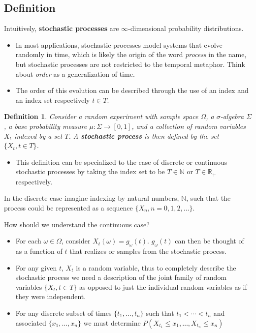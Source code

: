 \subsection{Definition}
\begin{frame}
Intuitively, \textbf{stochastic processes} are $\infty$-dimensional probability distributions.
\end{frame}

\begin{frame}
\begin{itemize}
\item In most applications, stochastic processes model systems that evolve randomly in time, which is likely the origin of the word \emph{process} in the name, but stochastic processes are not restricted to the temporal metaphor. Think about \emph{order} as a generalization of time.
\item The order of this evolution can be described through the use of an index and an index set respectively $t \in T$.
\end{itemize}

\newtheorem{stpo}{Definition}
\begin{stpo}
Consider a random experiment with sample space $\Omega$, a $\sigma$-algebra $\Sigma$, a base probability measure $\mu : \Sigma \rightarrow [0,1]$, and a collection of random variables $X_t$ indexed by a set $T$. A \textbf{stochastic process} is then defined by the set $\{X_t, t \in T\}$.
\end{stpo}
\begin{itemize}
\item This definition can be specialized to the case of discrete or continuous stochastic processes by taking the index set to be $T \in \mathbb{N}$ or $T \in \mathbb{R}_+$ respectively.
\end{itemize}
\end{frame}

\begin{frame}
In the discrete case imagine indexing by natural numbers, $\mathbb{N}$, such that the process could be represented as a sequence $\{ X_n, n = 0,1,2,\ldots \}$.
\end{frame}

\begin{frame}
How should we understand the continuous case?
\begin{itemize}
\item For each $\omega \in \Omega$, consider $X_t(\omega)=g_\omega(t)$. $g_\omega(t)$ can then be thought of as a function of $t$ that realizes or samples from the stochastic process.
\item For any given $t$, $X_t$ is a random variable, thus to completely describe the stochastic process we need a description of the joint family of random variables $\{ X_t, t \in T \}$ as opposed to just the individual random variables as if they were independent.
\item For any discrete subset of times $\{ t_1, \ldots, t_n \}$ such that $t_1 < \cdots < t_n$ and associated $\{ x_1, \ldots, x_n \}$ we must determine $	P(X_{t_1} \leq x_1, \ldots, X_{t_n} \leq x_n) $
\end{itemize}
\end{frame}


